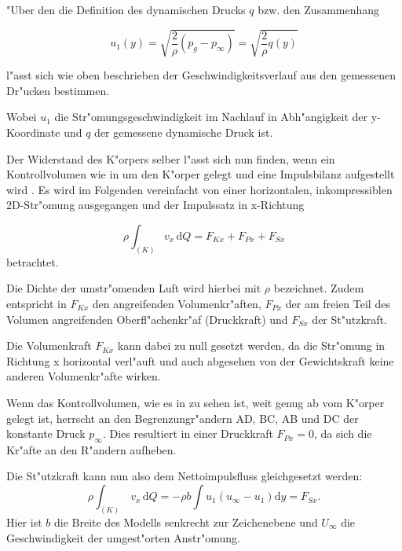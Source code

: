 "Uber den die Definition des dynamischen Drucks $q$ bzw. den Zusammenhang
\begin{center}
	\begin{equation}
		\label{geschwindigkeitsformel}
		u_{1}(y)= \sqrt{\frac{2}{\rho}(p_g - p_{\infty}) } = \sqrt{\frac{2}{\rho} q(y)}
	\end{equation}
\end{center}
l"asst sich wie oben beschrieben der Geschwindigkeitsverlauf aus den gemessenen Dr"ucken bestimmen.

Wobei $u_{1}$ die Str"omungsgeschwindigkeit im Nachlauf in Abh"angigkeit der y-Koordinate und $q$ der gemessene dynamische Druck ist.

Der Widerstand des K"orpers selber l"asst sich nun finden, wenn ein Kontrollvolumen wie in  um den K"orper gelegt und eine Impulsbilanz aufgestellt wird \cite{Hucho.2011}. Es wird im Folgenden vereinfacht von einer horizontalen, inkompressiblen 2D-Str"omung ausgegangen und der Impulssatz in x-Richtung

\begin{equation}
	\label{eq:impulssatz_allg}
	\rho \int_{(K)} v_x \, \mathrm{d}Q = F_{Kx} + F_{Px} + F_{Sx}
\end{equation}
betrachtet.

Die Dichte der umstr"omenden Luft wird hierbei mit $\rho$ bezeichnet.
Zudem entspricht in  $F_{Kx}$ den angreifenden Volumenkr"aften, $F_{Px}$ der am freien Teil des Volumen angreifenden Oberfl"achenkr"af (Druckkraft) und $F_{Sx}$ der St"utzkraft.


Die Volumenkraft $F_{Kx}$ kann dabei zu null gesetzt werden, da die Str"omung in Richtung x horizontal verl"auft und auch abgesehen von der Gewichtskraft keine anderen Volumenkr"afte wirken.

Wenn das Kontrollvolumen, wie es in  zu sehen ist, weit genug ab vom K"orper gelegt ist, herrscht an den Begrenzungr"andern AD, BC, AB und DC der konstante Druck $p_{\infty}$.
Dies resultiert in einer Druckkraft $F_{Px} = 0$, da sich die Kr"afte an den R"andern aufheben.

Die St"utzkraft kann nun also dem Nettoimpulsfluss gleichgesetzt werden:
\begin{equation}
	\label{eq:nettoimpulsfluss}
	\rho \int_{(K)} \, v_x \, \mathrm{d}Q	= -\rho b \int u_1(u_{\infty} - u_1) \mathrm{d}y = F_{Sx}.	
\end{equation}
Hier ist $b$ die Breite des Modells senkrecht zur Zeichenebene und $U_{\infty}$ die Geschwindigkeit der umgest"orten Anstr"omung.

